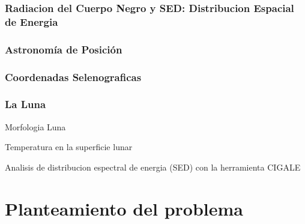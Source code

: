 \documentclass[12pt]{article}
\begin{document}
\subsubsection{Radiacion del Cuerpo Negro y SED: Distribucion Espacial de Energia}

\subsubsection{Astronomía de Posición}
\subsubsection{Coordenadas Selenograficas}
\subsubsection{La Luna}
Morfologia Luna \cite{PhysicsandAstronomyMoon}

Temperatura en la superficie lunar \cite{Zhengling2024}

Analisis de distribucion espectral de energia (SED) con la herramienta CIGALE \cite{Boquien2019}

\section{Planteamiento del problema}

\printbibliography
\end{document}
